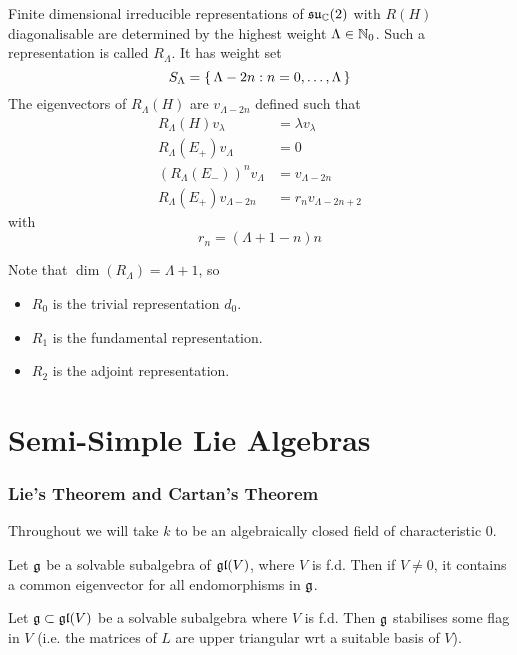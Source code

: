 \documentclass{article}
\begin{document}
\begin{theorem}
	Finite dimensional irreducible representations of $\mathfrak{su}_{\mathbb{C}}(2)$ with $R(H)$ diagonalisable are determined by the highest weight $\Lambda\in\mathbb{N}_0$. Such a representation is called $R_\Lambda$. It has weight set 
	\[
	S_\Lambda=\set{  \Lambda-2n : n=0,\dots,\Lambda  }
	\]
	The eigenvectors of $R_\Lambda(H)$ are $v_{\Lambda-2n}$ defined such that 
	\begin{align*}
		R_\Lambda(H) v_\lambda &= \lambda v_\lambda \\
		R_\Lambda(E_+) v_\Lambda &= 0 \\
		\left(R_\Lambda(E_-)\right)^n v_{\Lambda} &= v_{\Lambda-2n} \\
		R_\Lambda(E_+) v_{\Lambda-2n} &= r_n v_{\Lambda-2n+2}
	\end{align*}
	with 
	\[
	r_n=(\Lambda+1-n)n
	\]
\end{theorem}
Note that $\dim(R_\Lambda)=\Lambda+1$, so 
\begin{itemize}
	\item $R_0$ is the trivial representation $d_0$.
	\item $R_1$ is the fundamental representation.
	\item $R_2$ is the adjoint representation. 
\end{itemize}


\part{Semi-Simple Lie Algebras}

\section{Lie's Theorem and Cartan's Theorem}
\begin{notation}
	Throughout we will take $k$ to be an algebraically closed field of characteristic 0. 
\end{notation}

\begin{theorem}
	Let $\mathfrak{g}$ be a solvable subalgebra of $\mathfrak{gl}(V)$, where $V$ is f.d. Then if $V \neq 0$, it contains a common eigenvector for all endomorphisms in $\mathfrak{g}$. 
\end{theorem}
\begin{corollary}
	Let $\mathfrak{g}\subset \mathfrak{gl}(V)$ be a solvable subalgebra where $V$ is f.d. Then $\mathfrak{g}$ stabilises some flag in $V$ (i.e. the matrices of $L$ are upper triangular wrt a suitable basis of $V$). 
\end{corollary}
\end{document}

